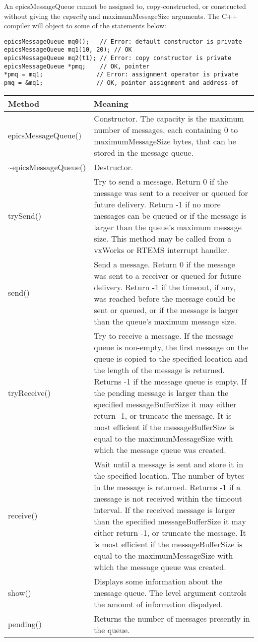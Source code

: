 An epicsMessageQueue cannot be assigned to, copy-constructed, or constructed without giving the \emph{capacity} and 
maximumMessageSize arguments.
The C++ compiler will object to some of the statements below:

\begin{verbatim}
epicsMessageQueue mq0();   // Error: default constructor is private
epicsMessageQueue mq1(10, 20); // OK
epicsMessageQueue mq2(t1); // Error: copy constructor is private
epicsMessageQueue *pmq;    // OK, pointer
*pmq = mq1;               // Error: assignment operator is private
pmq = &mq1;               // OK, pointer assignment and address-of
\end{verbatim}

\begin{center}
\begin{longtable}{p{1.35in}p{5.0in}}
\textbf{Method} & \textbf{Meaning}\\
\hline
epicsMessageQueue() & Constructor.
The capacity is the maximum number of messages, each containing 0 to maximumMessageSize bytes, that can be stored in the message queue.\\
\~{}epicsMessageQueue() & Destructor.\\
trySend() & Try to send a message.
Return 0 if the message was sent to a receiver or queued for future delivery.
Return -1 if no more messages can be queued or if the message is larger than the queue's maximum message size.
This method may be called from a vxWorks or RTEMS interrupt handler.\\
send() & Send a message.
Return 0 if the message was sent to a receiver or queued for future delivery.
Return -1 if the timeout, if any, was reached before the message could be sent or queued, or if the message is larger than the queue's maximum message size.\\
tryReceive() & Try to receive a message.
If the message queue is non-empty, the first message on the queue is copied to the specified location and the length of the message is returned.
Returns -1 if the message queue is empty.
If the pending message is larger than the specified messageBufferSize it may either return -1, or truncate the message.
It is most efficient if the messageBufferSize is equal to the maximumMessageSize with which the message queue was created.\\
receive() & Wait until a message is sent and store it in the specified location.
The number of bytes in the message is returned.
Returns -1 if a message is not received within the timeout interval.
If the received message is larger than the specified messageBufferSize it may either return -1, or truncate the message.
It is most efficient if the messageBufferSize is equal to the maximumMessageSize with which the message queue was created.\\
show() & Displays some information about the message queue.
The level argument controls the amount of information dispalyed.\\
pending() & Returns the number of messages presently in the queue.
\end{longtable}

\end{center}


